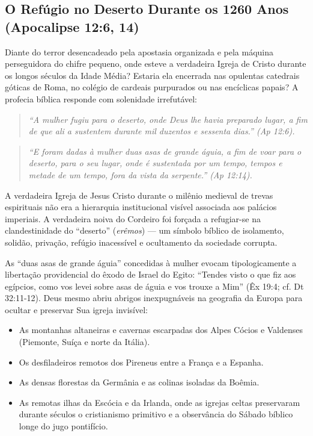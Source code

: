 \subsection{O Refúgio no Deserto Durante os 1260 Anos (Apocalipse 12:6, 14)}


Diante do terror desencadeado pela apostasia organizada e pela máquina perseguidora do chifre pequeno, onde esteve a verdadeira Igreja de Cristo durante os longos séculos da Idade Média? Estaria ela encerrada nas opulentas catedrais góticas de Roma, no colégio de cardeais purpurados ou nas encíclicas papais? A profecia bíblica responde com solenidade irrefutável:


\begin{quote}
\itshape ``A mulher fugiu para o deserto, onde Deus lhe havia preparado lugar, a fim de que ali a sustentem durante mil duzentos e sessenta dias.'' (Ap 12:6).
\end{quote}


\begin{quote}
\itshape ``E foram dadas à mulher duas asas de grande águia, a fim de voar para o deserto, para o seu lugar, onde é sustentada por um tempo, tempos e metade de um tempo, fora da vista da serpente.'' (Ap 12:14).
\end{quote}


A verdadeira Igreja de Jesus Cristo durante o milênio medieval de trevas espirituais não era a hierarquia institucional visível associada aos palácios imperiais. A verdadeira noiva do Cordeiro foi forçada a refugiar-se na clandestinidade do ``deserto'' (\textit{erêmos}) — um símbolo bíblico de isolamento, solidão, privação, refúgio inacessível e ocultamento da sociedade corrupta.

As ``duas asas de grande águia'' concedidas à mulher evocam tipologicamente a libertação providencial do êxodo de Israel do Egito: ``Tendes visto o que fiz aos egípcios, como vos levei sobre asas de águia e vos trouxe a Mim'' (Êx 19:4; cf. Dt 32:11-12). Deus mesmo abriu abrigos inexpugnáveis na geografia da Europa para ocultar e preservar Sua igreja invisível:
\begin{itemize}
  \item As montanhas altaneiras e cavernas escarpadas dos Alpes Cócios e Valdenses (Piemonte, Suíça e norte da Itália).
  \item Os desfiladeiros remotos dos Pireneus entre a França e a Espanha.
  \item As densas florestas da Germânia e as colinas isoladas da Boêmia.
  \item As remotas ilhas da Escócia e da Irlanda, onde as igrejas celtas preservaram durante séculos o cristianismo primitivo e a observância do Sábado bíblico longe do jugo pontifício.
\end{itemize}


